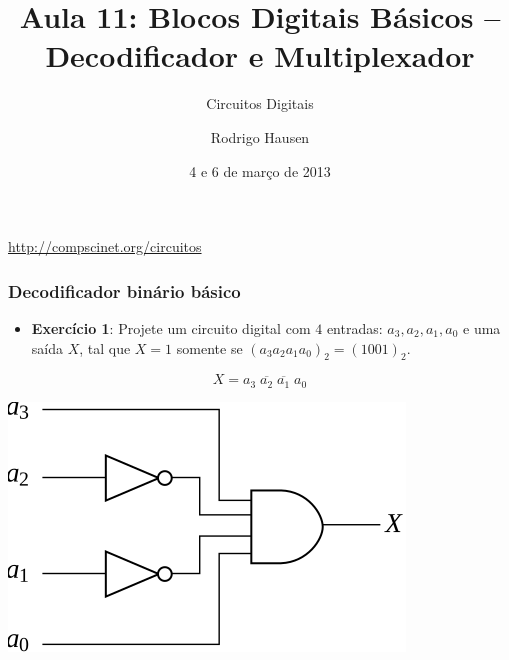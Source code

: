 \documentclass{beamer}
\title{Aula 11: Blocos Digitais Básicos -- Decodificador e Multiplexador}
\subtitle{Circuitos Digitais}
\author{Rodrigo Hausen}
\institute{CMCC -- UFABC}
\date{4 e 6 de março de 2013}
\newcommand{\Not}[1]{\overline{#1}}
\begin{document}
\begin{frame}
\maketitle

\vspace{-1cm}

\begin{center}
\url{http://compscinet.org/circuitos}
\end{center}

\end{frame}


\begin{frame}
\frametitle{Decodificador binário básico}

\begin{itemize}
\item \textbf{Exercício 1}: Projete um circuito digital com $4$ entradas:
$a_3, a_2, a_1, a_0$ e uma saída $X$, tal que $X = 1$ somente se $(a_3  a_2  a_1 a_0)_2 = (1001)_2$.
\end{itemize}

\pause
$$X = a_3 \; \Not{a_2} \; \Not{a_1} \; a_0$$

\pause
\begin{center}
\includegraphics{images/exemplo1}
\end{center}

\end{frame}
\end{document}

